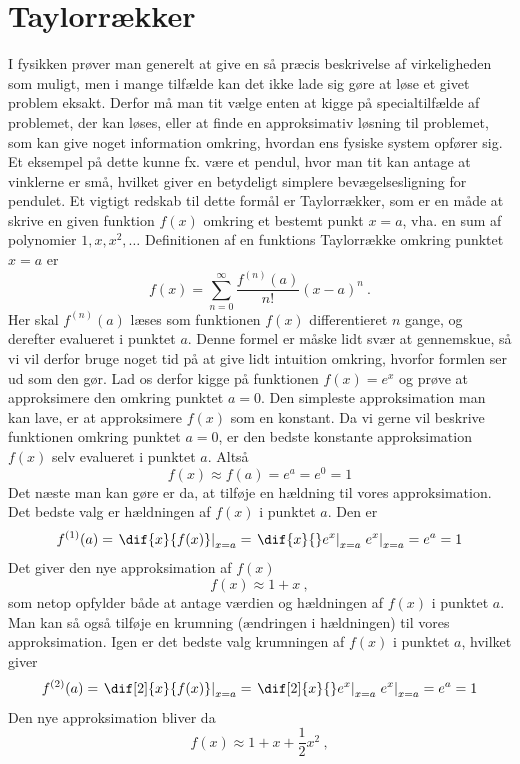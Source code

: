 \section{Taylorrækker} \label{sec:Taylor}
I fysikken prøver man generelt at give en så præcis beskrivelse af virkeligheden som muligt, men i mange tilfælde kan det ikke lade sig gøre at løse et givet problem eksakt. Derfor må man tit vælge enten at kigge på specialtilfælde af problemet, der kan løses, eller at finde en approksimativ løsning til problemet, som kan give noget information omkring, hvordan ens fysiske system opfører sig. Et eksempel på dette kunne fx. være et pendul, hvor man tit kan antage at vinklerne er små, hvilket giver en betydeligt simplere bevægelsesligning for pendulet. Et vigtigt redskab til dette formål er Taylorrækker, som er en måde at skrive en given funktion $f(x)$ omkring et bestemt punkt $x=a$, vha. en sum af polynomier $1,x,x^2,\ldots$ Definitionen af en funktions Taylorrække omkring punktet $x=a$ er
\begin{equation} \label{eq:TaylorInf}
f(x) = \sum\limits_{n = 0}^{\infty} \frac{f^{(n)}(a)}{n!} (x-a)^n \ .
\end{equation}
Her skal $f^{(n)}(a)$ læses som funktionen $f(x)$ differentieret $n$ gange, og derefter evalueret i punktet $a$. Denne formel er måske lidt svær at gennemskue, så vi vil derfor bruge noget tid på at give lidt intuition omkring, hvorfor formlen ser ud som den gør. Lad os derfor kigge på funktionen $f(x) = e^x$ og prøve at approksimere den omkring punktet $a = 0$. Den simpleste approksimation man kan lave, er at approksimere $f(x)$ som en konstant. Da vi gerne vil beskrive funktionen omkring punktet $a=0$, er den bedste konstante approksimation $f(x)$ selv evalueret i punktet $a$. Altså
$$f(x) \approx f(a) = e^a = e^0 = 1$$
Det næste man kan gøre er da, at tilføje en hældning til vores approksimation. Det bedste valg er hældningen af $f(x)$ i punktet $a$. Den er
$$f^{(1)}(a) = \left. \dif{x}{f(x)} \right|_{x=a} = \left. \dif{x}{} e^x \right|_{x=a} \left. e^x \right|_{x=a} = e^a = 1$$
Det giver den nye approksimation af $f(x)$
$$f(x) \approx 1 + x \ ,$$
som netop opfylder både at antage værdien og hældningen af $f(x)$ i punktet $a$. Man kan så også tilføje en krumning (ændringen i hældningen) til vores approksimation. Igen er det bedste valg krumningen af $f(x)$ i punktet $a$, hvilket giver
$$f^{(2)}(a) = \left. \dif[2]{x}{f(x)} \right|_{x=a} = \left. \dif[2]{x}{} e^x \right|_{x=a} \left. e^x \right|_{x=a} = e^a = 1$$
Den nye approksimation bliver da
$$f(x) \approx 1 +  x + \frac{1}{2} x^2 \ ,$$
